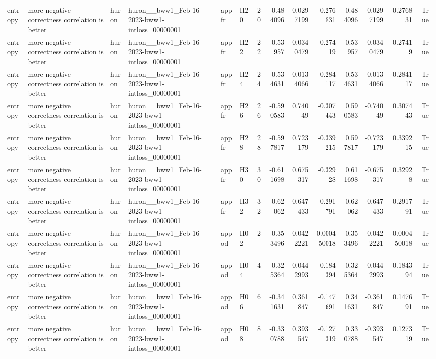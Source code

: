 \begin{longtable}{llllllrrrrrrrr}
entropy & more negative correctness correlation is better & huron & huron\_\_bww1\_Feb-16-2023-bww1-intloss\_00000001 & appfr & H20 & 20 & -0.484096 & 0.0297199 & -0.276831 & 0.484096 & -0.0297199 & 0.276831 & True \\
entropy & more negative correctness correlation is better & huron & huron\_\_bww1\_Feb-16-2023-bww1-intloss\_00000001 & appfr & H22 & 22 & -0.53957 & 0.0340479 & -0.27419 & 0.53957 & -0.0340479 & 0.27419 & True \\
entropy & more negative correctness correlation is better & huron & huron\_\_bww1\_Feb-16-2023-bww1-intloss\_00000001 & appfr & H24 & 24 & -0.534631 & 0.0134066 & -0.284117 & 0.534631 & -0.0134066 & 0.284117 & True \\
entropy & more negative correctness correlation is better & huron & huron\_\_bww1\_Feb-16-2023-bww1-intloss\_00000001 & appfr & H26 & 26 & -0.590583 & 0.74049 & -0.307443 & 0.590583 & -0.74049 & 0.307443 & True \\
entropy & more negative correctness correlation is better & huron & huron\_\_bww1\_Feb-16-2023-bww1-intloss\_00000001 & appfr & H28 & 28 & -0.597817 & 0.723179 & -0.339215 & 0.597817 & -0.723179 & 0.339215 & True \\
entropy & more negative correctness correlation is better & huron & huron\_\_bww1\_Feb-16-2023-bww1-intloss\_00000001 & appfr & H30 & 30 & -0.611698 & 0.675317 & -0.32928 & 0.611698 & -0.675317 & 0.32928 & True \\
entropy & more negative correctness correlation is better & huron & huron\_\_bww1\_Feb-16-2023-bww1-intloss\_00000001 & appfr & H32 & 32 & -0.62062 & 0.647433 & -0.291791 & 0.62062 & -0.647433 & 0.291791 & True \\
entropy & more negative correctness correlation is better & huron & huron\_\_bww1\_Feb-16-2023-bww1-intloss\_00000001 & appod & H02 & 2 & -0.353496 & 0.0422221 & 0.000450018 & 0.353496 & -0.0422221 & -0.000450018 & True \\
entropy & more negative correctness correlation is better & huron & huron\_\_bww1\_Feb-16-2023-bww1-intloss\_00000001 & appod & H04 & 4 & -0.325364 & 0.0442993 & -0.184394 & 0.325364 & -0.0442993 & 0.184394 & True \\
entropy & more negative correctness correlation is better & huron & huron\_\_bww1\_Feb-16-2023-bww1-intloss\_00000001 & appod & H06 & 6 & -0.341631 & 0.361847 & -0.147691 & 0.341631 & -0.361847 & 0.147691 & True \\
entropy & more negative correctness correlation is better & huron & huron\_\_bww1\_Feb-16-2023-bww1-intloss\_00000001 & appod & H08 & 8 & -0.330788 & 0.393547 & -0.127319 & 0.330788 & -0.393547 & 0.127319 & True \\

\end{longtable}
